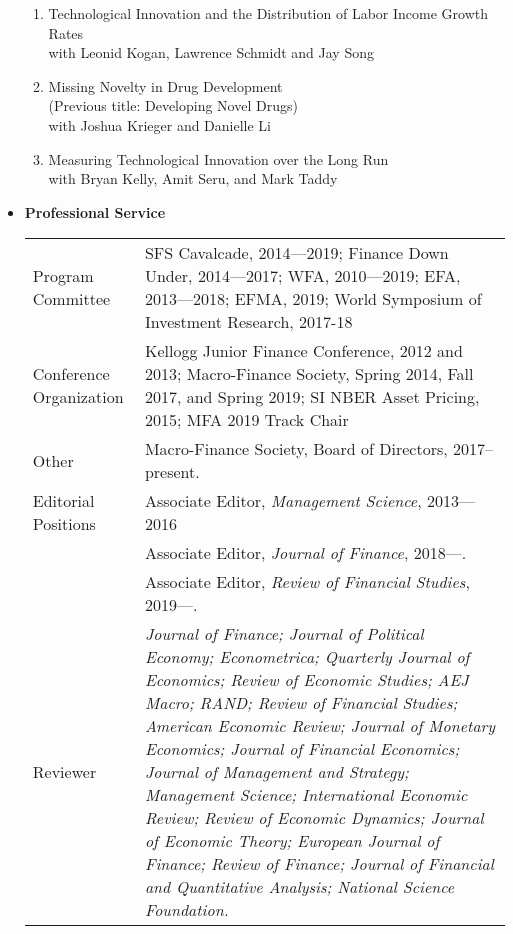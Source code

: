 \documentclass[11pt,letterpaper,serif,overlapped]{res}
\begin{document}
\begin{resume}
\begin{itemize}
\begin{enumerate}
\item Technological Innovation and the Distribution of Labor Income Growth Rates\\ with Leonid Kogan, Lawrence Schmidt and Jay Song
\item Missing Novelty in Drug Development\\(Previous title:  Developing Novel Drugs)\\with Joshua Krieger and Danielle Li
\item Measuring Technological Innovation over the Long Run\\ with Bryan Kelly, Amit Seru, and Mark Taddy
\end{enumerate}







\vspace{0.5cm}
\item \textbf{Professional Service} \\
\begin{longtable}{lp{11.5cm}}
Program Committee & SFS Cavalcade, 2014---2019; Finance Down Under,   2014---2017;  WFA,  2010---2019; EFA, 2013---2018; EFMA, 2019;  World Symposium of Investment Research, 2017-18 \\[0.2cm]
Conference Organization & Kellogg Junior Finance Conference,  2012 and 2013;  Macro-Finance Society, Spring 2014, Fall 2017, and Spring 2019; SI NBER Asset Pricing, 2015; MFA 2019 Track Chair\\[0.2cm]
Other & Macro-Finance Society, Board of Directors, 2017--present.
\\[0.2cm]

Editorial Positions & Associate Editor, \emph{Management Science}, 2013---2016\\
  &Associate Editor, \emph{Journal of Finance}, 2018---.\\
  &Associate Editor, \emph{Review of Financial Studies}, 2019---.\\[0.2cm]

Reviewer&
\emph{Journal of Finance; Journal of Political Economy; Econometrica; Quarterly Journal of Economics; Review of Economic Studies; AEJ Macro; RAND;  Review of Financial Studies; American Economic Review;  Journal of Monetary Economics; Journal of Financial Economics; Journal of Management and Strategy; Management Science;  International Economic Review; Review of Economic Dynamics;   Journal of Economic Theory;   European Journal of Finance;   Review of Finance; Journal of Financial and Quantitative Analysis; National Science Foundation.}\\[0.2cm]


\end{longtable}
\end{itemize}
\end{resume}
\end{document}
